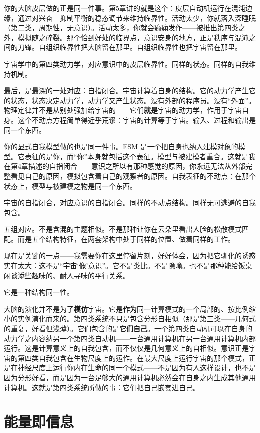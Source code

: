 \documentclass[11pt, twoside, openright]{book}
\begin{document}
你的大脑皮层做的正是同一件事。第5章讲的就是这个：皮层自动机运行在混沌边缘，通过对兴奋---抑制平衡的稳态调节来维持临界性。活动太少，你就落入深睡眠（第二类，周期性，无意识）。活动太多，你就会癫痫发作------被推出第四类之外，模拟随之碎裂。那个恰到好处的临界点，意识安身的地方，正是秩序与混沌之间的刀锋。自组织临界性把大脑留在那里。自组织临界性也把宇宙留在那里。

宇宙学中的第四类动力学，对应意识中的皮层临界性。同样的状态。同样的自我维持机制。

最后，是最深的一处对应：自指闭合。宇宙计算着自身的结构。它的动力学产生它的状态，状态决定动力学，动力学又产生状态。没有外部的程序员。没有“外面”。物理定律并不是从别处强加给宇宙的------它们\textbf{就是}宇宙的动力学，作用于宇宙自身。这个不动点方程简单得近乎荒谬：宇宙的计算等于宇宙。输入、过程和输出是同一个东西。

你的显式自我模型做的也是同一件事。ESM 是一个把自身也纳入建模对象的模型。它表征的是你，而“你”本身就包括这个表征。模型与被建模者重合。这就是我在第4章描述的自指闭合------意识之所以有那种感觉的原因，你永远无法从外部完整看见自己的原因，模拟包含着自己的观察者的原因。自我表征的不动点：在那个状态上，模型与被建模之物是同一个东西。

宇宙的自指闭合，对应意识的自指闭合。同样的不动点结构。同样无可逃避的自我包含。

五组对应。不是含混的主题相似。不是那种让你在云朵里看出人脸的松散模式匹配。而是五个结构特征，在两套架构中处于同样的位置、做着同样的工作。

现在是关键的一点------我需要你在这里停留片刻，好好体会，因为把它驯化的诱惑实在太大：这不是“宇宙‘像’意识”。它不是类比。不是隐喻。也不是那种能给饭桌闲谈添些趣味的、耐人寻味的平行关系。

它是一种结构同一性。

大脑的演化并不是为了\textbf{模仿}宇宙。它是\textbf{作为}同一计算模式的一个局部的、按比例缩小的实例演化而来的。第四类系统不只是包含分形自相似（那是第三类------几何式的重复，好看但浅薄）。它们包含的是\textbf{它们自己}。一个第四类自动机可以在自身的动力学之内容纳另一个第四类自动机------一台通用计算机在另一台通用计算机内部运行。这是计算意义上的自我包含，而不仅仅是几何意义上的自相似。意识正是宇宙的第四类自我包含在生物尺度上的运作。在最大尺度上运行宇宙的那个模式，正是在神经尺度上运行你内在生命的同一个模式------不是因为有人这样设计，也不是因为分形好看，而是因为一台足够大的通用计算机必然会在自身之内生成其他通用计算机。这就是第四类系统所做的事：它们把自己嵌套进自己。

\section*{能量即信息}
\end{document}

